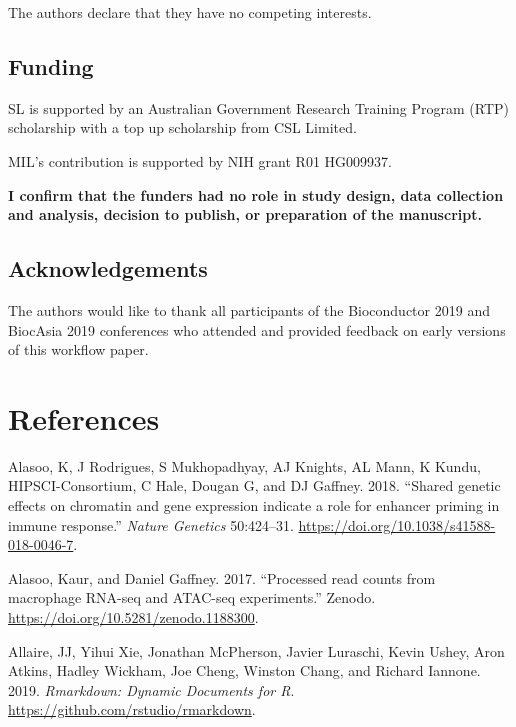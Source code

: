 \documentclass[
]{article}
\begin{document}
The authors declare that they have no competing interests.

\hypertarget{funding}{%
\subsection{Funding}\label{funding}}

SL is supported by an Australian Government Research Training Program (RTP)
scholarship with a top up scholarship from CSL Limited.

MIL's contribution is supported by NIH grant R01 HG009937.

\textbf{I confirm that the funders had no role in study design, data collection and
analysis, decision to publish, or preparation of the manuscript.}

\hypertarget{acknowledgements}{%
\subsection{Acknowledgements}\label{acknowledgements}}

The authors would like to thank all participants of the Bioconductor 2019 and
BiocAsia 2019 conferences who attended and provided feedback on early versions
of this workflow paper.

\hypertarget{references}{%
\section*{References}\label{references}}

\hypertarget{refs}{}
\leavevmode\hypertarget{ref-alasoo}{}%
Alasoo, K, J Rodrigues, S Mukhopadhyay, AJ Knights, AL Mann, K Kundu, HIPSCI-Consortium, C Hale, Dougan G, and DJ Gaffney. 2018. ``Shared genetic effects on chromatin and gene expression indicate a role for enhancer priming in immune response.'' \emph{Nature Genetics} 50:424--31. \url{https://doi.org/10.1038/s41588-018-0046-7}.

\leavevmode\hypertarget{ref-alasooZenodo}{}%
Alasoo, Kaur, and Daniel Gaffney. 2017. ``Processed read counts from macrophage RNA-seq and ATAC-seq experiments.'' Zenodo. \url{https://doi.org/10.5281/zenodo.1188300}.

\leavevmode\hypertarget{ref-rmarkdown}{}%
Allaire, JJ, Yihui Xie, Jonathan McPherson, Javier Luraschi, Kevin Ushey, Aron Atkins, Hadley Wickham, Joe Cheng, Winston Chang, and Richard Iannone. 2019. \emph{Rmarkdown: Dynamic Documents for R}. \url{https://github.com/rstudio/rmarkdown}.
\end{document}
